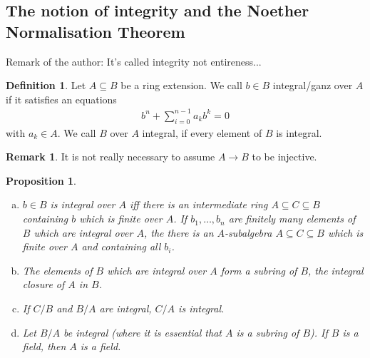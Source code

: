 \documentclass[DIV=14,parskip=half]{scrartcl}
\newtheorem{prop}{Proposition}[subsection]
\theoremstyle{definition}
\newtheorem{defi}{Definition}[subsection]
\newtheorem{rem}{Remark}[subsection]
\newcommand{\ldotspam}{,\ldots,}
\begin{document}
\subsection{The notion of integrity and the Noether Normalisation Theorem}
Remark of the author: It's called integrity not entireness...
\begin{defi}\label{def:integrity}
 Let $A\subseteq B$ be a ring extension. We call $b\in B$ integral/ganz over $A$ if it satisfies an equations
 \begin{align*}
  b^n +\sum_{i=0}^{n-1} a_kb^k =0
 \end{align*}
 with $a_k\in A$. We call $B$ over $A$ integral, if every element of $B$ is integral.
\end{defi}
\begin{rem}
 It is not really necessary to assume $A\to B$ to be injective.
\end{rem}
\begin{prop}
 \begin{enumerate}[a)]
  \item $b\in B$ is integral over $A$ iff there is an intermediate ring $A\subseteq C\subseteq B$ containing $b$ which is finite over $A$. If $b_1\ldotspam b_n$ are finitely many elements of $B$ which are integral over $A$, the there is an $A$-subalgebra $A\subseteq C\subseteq B$ which is finite over $A$ and containing all $b_i$.
  \item The elements of $B$ which are integral over $A$ form a subring of $B$, the integral closure of $A$ in $B$.
  \item If $C/B$ and $B/A$ are integral, $C/A$ is integral.
  \item Let $B/A$ be integral (where it is essential that $A$ is a subring of $B$). If $B$ is a field, then $A$ is a field.
 \end{enumerate}

\end{prop}
\end{document}
